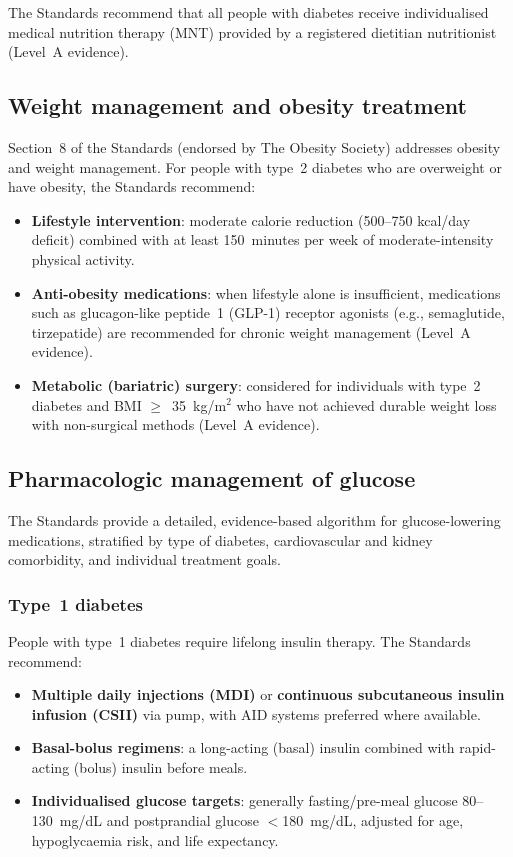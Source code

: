 \documentclass[11pt,a4paper]{article}
\begin{document}
The Standards recommend that all people with diabetes receive individualised
medical nutrition therapy (MNT) provided by a registered dietitian nutritionist
(Level~A evidence).

\subsection{Weight management and obesity treatment}

Section~8 of the Standards (endorsed by The Obesity Society) addresses
obesity and weight management. For people with type~2 diabetes who are
overweight or have obesity, the Standards recommend:

\begin{itemize}
  \item \textbf{Lifestyle intervention}: moderate calorie reduction (500--750
        kcal/day deficit) combined with at least 150~minutes per week of
        moderate-intensity physical activity.
  \item \textbf{Anti-obesity medications}: when lifestyle alone is
        insufficient, medications such as glucagon-like peptide~1 (GLP-1)
        receptor agonists (e.g., semaglutide, tirzepatide) are recommended
        for chronic weight management (Level~A evidence).
  \item \textbf{Metabolic (bariatric) surgery}: considered for individuals
        with type~2 diabetes and BMI $\geq$~35~kg/m$^2$ who have not
        achieved durable weight loss with non-surgical methods (Level~A
        evidence).
\end{itemize}

\subsection{Pharmacologic management of glucose}

The Standards provide a detailed, evidence-based algorithm for glucose-lowering
medications, stratified by type of diabetes, cardiovascular and kidney
comorbidity, and individual treatment goals.

\subsubsection{Type~1 diabetes}

People with type~1 diabetes require lifelong insulin therapy. The Standards
recommend:

\begin{itemize}
  \item \textbf{Multiple daily injections (MDI)} or \textbf{continuous
        subcutaneous insulin infusion (CSII)} via pump, with AID systems
        preferred where available.
  \item \textbf{Basal-bolus regimens}: a long-acting (basal) insulin
        combined with rapid-acting (bolus) insulin before meals.
  \item \textbf{Individualised glucose targets}: generally fasting/pre-meal
        glucose 80--130~mg/dL and postprandial glucose $<$180~mg/dL,
        adjusted for age, hypoglycaemia risk, and life expectancy.
\end{itemize}
\end{document}
